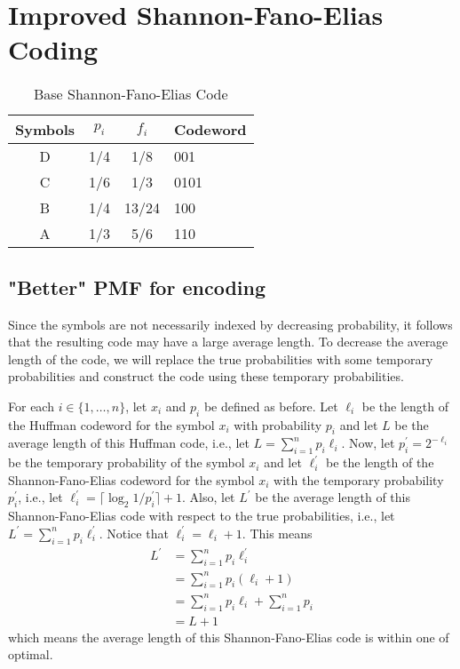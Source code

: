 \documentclass[10pt,letterpaper,notitlepage,draft]{article}
\theoremstyle{definition}
\begin{document}
\section{Improved Shannon-Fano-Elias Coding}

\begin{table}[h]
\begin{center}
\begin{tabular}{|c|c|c|l|}
\hline
Symbols & $p_i$ & $f_i$ & Codeword \\ 
\hline 
\hline
D & 1/4 & 1/8 & 001 \\
\hline
C & 1/6 & 1/3 & 0101 \\
\hline
B & 1/4 & 13/24 & 100 \\
\hline
A & 1/3 & 5/6 & 110 \\
\hline
\end{tabular}
\end{center}
\caption{Base Shannon-Fano-Elias Code}\label{t1}
\end{table}


\subsection{"Better" PMF for encoding}
Since the symbols are not necessarily indexed by decreasing probability, it follows that the resulting code may have a large average length.
To decrease the average length of the code, we will replace the true probabilities with some temporary probabilities and construct the code using these temporary probabilities.

For each $i \in \lbrace 1, \ldots, n\rbrace$, let $x_i$ and $p_i$ be defined as before.
Let $\ell_i$ be the length of the Huffman codeword for the symbol $x_i$ with probability $p_i$ and let $L$ be the average length of this Huffman code, i.e., let $L = \sum_{i=1}^n p_i \ell_i$.
Now, let $p_i^\prime = 2^{-\ell_i}$ be the temporary probability of the symbol $x_i$ and let $\ell_i^\prime$ be the length of the Shannon-Fano-Elias codeword for the symbol $x_i$ with the temporary probability $p_i^\prime$, i.e., let $\ell_i^\prime =  \lceil\log_2 1 / p_i^\prime \rceil + 1$.
Also, let $L^\prime$ be the average length of this Shannon-Fano-Elias code with respect to the true probabilities, i.e., let $L^\prime = \sum_{i=1}^n p_i \ell_i^\prime$.
Notice that $\ell_i^\prime = \ell_i + 1$.
This means
\begin{align*}
L^\prime
&= \sum_{i=1}^n p_i \ell_i^\prime \\
&= \sum_{i=1}^n p_i \left(\ell_i + 1\right) \\
&= \sum_{i=1}^n p_i \ell_i + \sum_{i=1}^n p_i \\
&= L + 1
\end{align*}
which means the average length of this Shannon-Fano-Elias code is within one of optimal.
\end{document}
